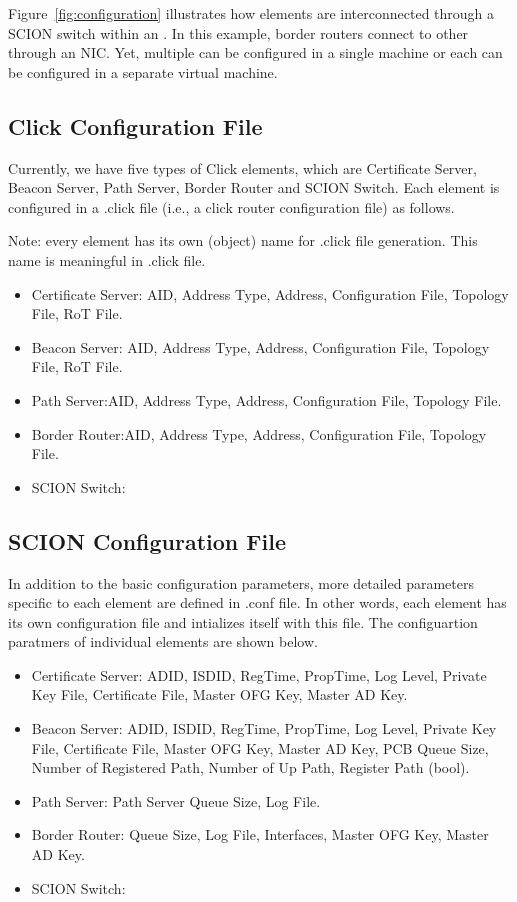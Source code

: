 Figure~\ref{fig:configuration} illustrates how elements are interconnected through a SCION switch within an \AD. In this example, border routers connect to other \ADs through an NIC. Yet, multiple \ADs can be configured in a single machine or each \AD can be configured in a separate virtual machine.


\subsection{Click Configuration File}
Currently, we have five types of Click elements, which are Certificate Server, Beacon Server, Path Server, Border Router and SCION Switch.  
Each element is configured in a .click file (i.e., a click router configuration file) as follows.

Note: every element has its own (object) name for .click file generation. This name is meaningful in .click file.

\begin{itemize}
\item Certificate Server: AID, Address Type, Address, Configuration File, Topology File, RoT File.
\item Beacon Server: AID, Address Type, Address, Configuration File, Topology File, RoT File.
\item Path Server:AID, Address Type, Address, Configuration File, Topology File.
\item Border Router:AID, Address Type, Address, Configuration File, Topology File.
\item SCION Switch:
\end{itemize}

\subsection{SCION Configuration File}
In addition to the basic configuration parameters, more detailed parameters specific to each element are defined in .conf file. In other words, each element has its own configuration file and intializes itself with this file. The configuartion paratmers of individual elements are shown below.

\begin{itemize}
\item Certificate Server: ADID, ISDID, RegTime, PropTime, Log Level, Private Key File, Certificate File, Master OFG Key, Master AD Key.
\item Beacon Server: ADID, ISDID, RegTime, PropTime, Log Level, Private Key File, Certificate File, Master OFG Key, Master AD Key, PCB Queue Size, Number of Registered Path, Number of Up Path, Register Path (bool).
\item Path Server: Path Server Queue Size,  Log File.
\item Border Router: Queue Size, Log File, Interfaces, Master OFG Key, Master AD Key. 
\item SCION Switch:
\end{itemize}

